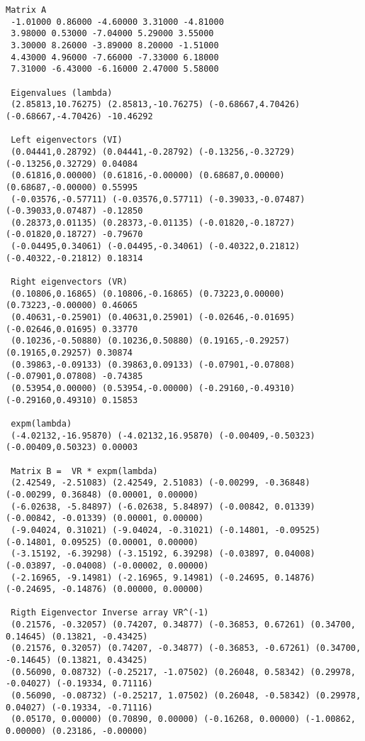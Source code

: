 \documentclass{article}
\begin{document}
\begin{small}
\begin{verbatim}
Matrix A
 -1.01000 0.86000 -4.60000 3.31000 -4.81000
 3.98000 0.53000 -7.04000 5.29000 3.55000
 3.30000 8.26000 -3.89000 8.20000 -1.51000
 4.43000 4.96000 -7.66000 -7.33000 6.18000
 7.31000 -6.43000 -6.16000 2.47000 5.58000

 Eigenvalues (lambda)
 (2.85813,10.76275) (2.85813,-10.76275) (-0.68667,4.70426) (-0.68667,-4.70426) -10.46292

 Left eigenvectors (VI)
 (0.04441,0.28792) (0.04441,-0.28792) (-0.13256,-0.32729) (-0.13256,0.32729) 0.04084
 (0.61816,0.00000) (0.61816,-0.00000) (0.68687,0.00000) (0.68687,-0.00000) 0.55995
 (-0.03576,-0.57711) (-0.03576,0.57711) (-0.39033,-0.07487) (-0.39033,0.07487) -0.12850
 (0.28373,0.01135) (0.28373,-0.01135) (-0.01820,-0.18727) (-0.01820,0.18727) -0.79670
 (-0.04495,0.34061) (-0.04495,-0.34061) (-0.40322,0.21812) (-0.40322,-0.21812) 0.18314

 Right eigenvectors (VR)
 (0.10806,0.16865) (0.10806,-0.16865) (0.73223,0.00000) (0.73223,-0.00000) 0.46065
 (0.40631,-0.25901) (0.40631,0.25901) (-0.02646,-0.01695) (-0.02646,0.01695) 0.33770
 (0.10236,-0.50880) (0.10236,0.50880) (0.19165,-0.29257) (0.19165,0.29257) 0.30874
 (0.39863,-0.09133) (0.39863,0.09133) (-0.07901,-0.07808) (-0.07901,0.07808) -0.74385
 (0.53954,0.00000) (0.53954,-0.00000) (-0.29160,-0.49310) (-0.29160,0.49310) 0.15853

 expm(lambda)
 (-4.02132,-16.95870) (-4.02132,16.95870) (-0.00409,-0.50323) (-0.00409,0.50323) 0.00003

 Matrix B =  VR * expm(lambda)
 (2.42549, -2.51083) (2.42549, 2.51083) (-0.00299, -0.36848) (-0.00299, 0.36848) (0.00001, 0.00000)
 (-6.02638, -5.84897) (-6.02638, 5.84897) (-0.00842, 0.01339) (-0.00842, -0.01339) (0.00001, 0.00000)
 (-9.04024, 0.31021) (-9.04024, -0.31021) (-0.14801, -0.09525) (-0.14801, 0.09525) (0.00001, 0.00000)
 (-3.15192, -6.39298) (-3.15192, 6.39298) (-0.03897, 0.04008) (-0.03897, -0.04008) (-0.00002, 0.00000)
 (-2.16965, -9.14981) (-2.16965, 9.14981) (-0.24695, 0.14876) (-0.24695, -0.14876) (0.00000, 0.00000)

 Rigth Eigenvector Inverse array VR^(-1)
 (0.21576, -0.32057) (0.74207, 0.34877) (-0.36853, 0.67261) (0.34700, 0.14645) (0.13821, -0.43425)
 (0.21576, 0.32057) (0.74207, -0.34877) (-0.36853, -0.67261) (0.34700, -0.14645) (0.13821, 0.43425)
 (0.56090, 0.08732) (-0.25217, -1.07502) (0.26048, 0.58342) (0.29978, -0.04027) (-0.19334, 0.71116)
 (0.56090, -0.08732) (-0.25217, 1.07502) (0.26048, -0.58342) (0.29978, 0.04027) (-0.19334, -0.71116)
 (0.05170, 0.00000) (0.70890, 0.00000) (-0.16268, 0.00000) (-1.00862, 0.00000) (0.23186, -0.00000)


\end{verbatim}
\end{small}
\end{document}
